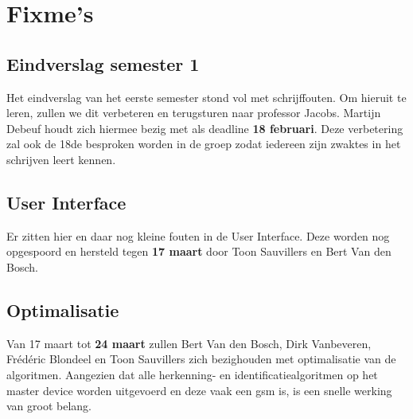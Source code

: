 \documentclass[a4paper,11pt]{article}
\begin{document}
\section{Fixme's}
\subsection{Eindverslag semester 1}
Het eindverslag van het eerste semester stond vol met schrijffouten. Om hieruit te leren, zullen we dit verbeteren en terugsturen naar professor Jacobs. Martijn Debeuf houdt zich hiermee bezig met als deadline {\bf 18 februari}. Deze verbetering zal ook de 18de besproken worden in de groep zodat iedereen zijn zwaktes in het schrijven leert kennen.

\subsection{User Interface}
Er zitten hier en daar nog kleine fouten in de User Interface. Deze worden nog opgespoord en hersteld tegen {\bf 17 maart} door Toon Sauvillers en Bert Van den Bosch.

\subsection {Optimalisatie}
Van 17 maart tot {\bf 24 maart} zullen Bert Van den Bosch, Dirk Vanbeveren, Frédéric Blondeel en Toon Sauvillers zich bezighouden met optimalisatie van de algoritmen. Aangezien dat alle herkenning- en identificatiealgoritmen op het master device worden uitgevoerd en deze vaak een gsm is, is een snelle werking van groot belang.
\end{document}
